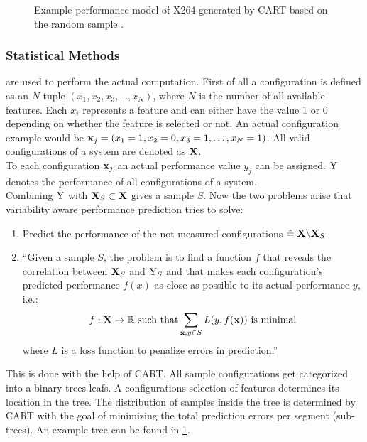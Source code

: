 \begin{figure}[!]
	\vspace{-1\baselineskip}
	\setlength{}
	
	\caption{Example performance model of X264 generated by CART based on the random sample \cite{VariabilityAwarePerformancePredictionJianmeiSigmundApel}.}	
	\label{fig:VAPPExampleTree}	
\end{figure}
\FloatBarrier %
\subsubsection{Statistical Methods}  are used to perform the actual computation. First of all a configuration is defined as an $N$-tuple $(x_1,x_2,x_3,...,x_N)$, where $N$ is the number of all available features. Each $x_i$ represents a feature and can either have the value 1 or 0 depending on whether the feature is selected or not. An actual configuration example would be $\mathrm{\mathbf{x}}_j = (x_1=1,x_2=0,x_3=1,\dots,x_N = 1)$. All valid configurations of a system are denoted as $\mathbf{X}$.\\
To each configuration $\mathrm{\mathbf{x}}_j$ an actual performance value $y_j$ can be assigned. $\mathrm{Y}$ denotes the performance of all configurations of a system.\\
Combining $\mathrm{Y}$ with $\mathbf{X}_S\subset\mathbf{X}$ gives a sample $S$. Now the two problems arise that variability aware performance prediction tries to solve:
\begin{enumerate}
	\item Predict the performance of the not measured configurations $\hat{=}\;\mathbf{X}\backslash\mathbf{X}_S$.
	\item ``Given a sample $S$, the problem is to find a function $f$ that reveals the correlation between $\mathbf{X}_S$ and $\mathrm{Y}_S$ and that makes each configuration’s predicted performance $f(x)$ as close as possible to its actual performance $y$, i.e.:
	\begin{equation}
	f : \mathbf{X} \rightarrow  \mathbb{R} \text{ such that} \sum_{\mathrm{\mathbf{x}},y \in S} L(y,f(\mathrm{\mathbf{x}})) \text{ is minimal}
	\end{equation} 	where $L$ is a loss function to penalize errors in prediction.''\cite{VariabilityAwarePerformancePredictionJianmeiSigmundApel}
\end{enumerate}
This is done with the help of CART. All sample configurations get categorized into a binary trees leafs. A configurations selection of features determines its location in the tree. The distribution of samples inside the tree is determined by CART with the goal of minimizing the total prediction errors per segment (sub-trees). An example tree can be found in \cref{fig:VAPPExampleTree}.
